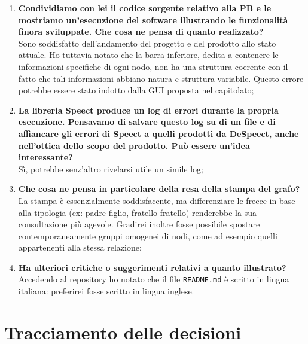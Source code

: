 \documentclass[openany,12pt,a4paper]{article}
\begin{document}
  \begin{enumerate}
  	
  	\item \textbf{Condividiamo con lei il codice sorgente relativo alla PB e le mostriamo un'esecuzione del software illustrando le funzionalità finora sviluppate. Che cosa ne pensa di quanto realizzato?} \\
  	Sono soddisfatto dell'andamento del progetto e del prodotto allo stato attuale. Ho tuttavia notato che la barra inferiore, dedita a contenere le informazioni specifiche di ogni nodo, non ha una struttura coerente con il fatto che tali informazioni abbiano natura e struttura variabile. Questo errore potrebbe essere stato indotto dalla GUI proposta nel capitolato;
  	
  	\item \textbf{La libreria Speect produce un log di errori durante la propria esecuzione. Pensavamo di salvare questo log su di un file e di affiancare gli errori di Speect a quelli prodotti da DeSpeect, anche nell'ottica dello scopo del prodotto. Può essere un'idea interessante?} \\  
  	Sì, potrebbe senz'altro rivelarsi utile un simile log;
  	
  	\item \textbf{Che cosa ne pensa in particolare della resa della stampa del grafo?} \\
  	La stampa è essenzialmente soddisfacente, ma differenziare le frecce in base alla tipologia (ex: padre-figlio, fratello-fratello) renderebbe la sua consultazione più agevole. Gradirei inoltre fosse possibile spostare contemporaneamente gruppi omogenei di nodi, come ad esempio quelli appartenenti alla stessa relazione;
  	
  	\item \textbf{Ha ulteriori critiche o suggerimenti relativi a quanto illustrato?} \\
  	Accedendo al repository ho notato che il file \verb|README.md| è scritto in lingua italiana: preferirei fosse scritto in lingua inglese.
  \end{enumerate} 
 
  \section{Tracciamento delle decisioni} 
   
\end{document}
